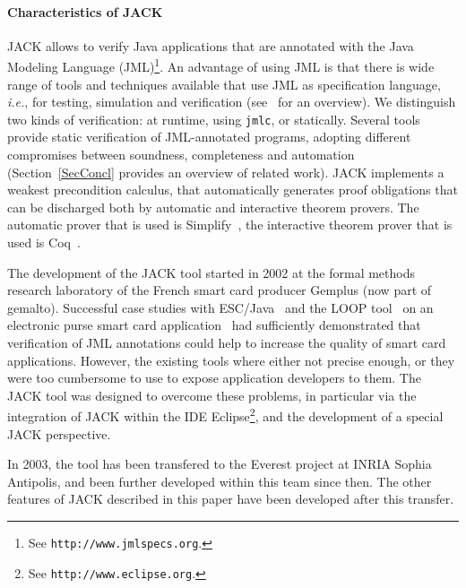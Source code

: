 \paragraph{Characteristics of JACK}
JACK allows to verify Java applications that are annotated with the
Java Modeling Language (JML)\footnote{See
\texttt{http://www.jmlspecs.org}.}. An advantage of using JML is that
there is wide range of tools and techniques available that use JML as
specification language, 
\emph{i.e.}, for testing, simulation and verification 
(see~\cite{BurdyCCEKLLP03} for an overview). We distinguish two kinds
of verification: at runtime, using
\texttt{jmlc}, or statically. Several tools provide
static verification of JML-annotated programs, adopting different
compromises between soundness, completeness and automation (Section~\ref{SecConcl}
provides an overview of related work).  JACK implements a weakest
precondition calculus, that automatically generates proof obligations
that can be discharged both by automatic and interactive theorem
provers. The automatic prover that is used is
Simplify~\cite{DetlefsNS05}, the interactive theorem prover that is
used is Coq~\cite{CoqManualV81}.


The development of the JACK tool started in 2002 at the formal methods
research laboratory of the French smart card producer Gemplus (now
part of gemalto). Successful case studies with ESC/Java~\cite{CokK04}
and the LOOP tool~\cite{BergJ01} on an electronic purse smart card
application~\cite{final:Form.Met} had sufficiently demonstrated that
verification of JML annotations could help to increase the quality of
smart card applications. However, the existing tools where either not
precise enough, or they were too cumbersome to use to expose
application developers to them. The JACK tool was designed to overcome
these problems, in particular via the integration of JACK within the
IDE Eclipse\footnote{See \texttt{http://www.eclipse.org}.}, and the
development of a special JACK perspective.

In 2003, the tool has been transfered to the Everest project at INRIA
Sophia Antipolis, and been further developed within this team since
then. The other features of JACK described in this paper have been
developed after this transfer.

